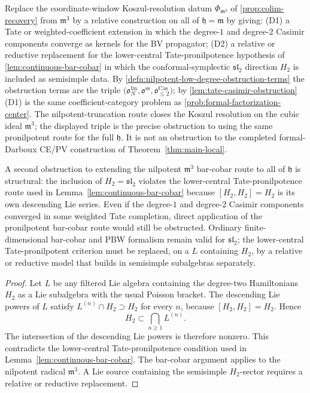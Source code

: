 \begin{prob}
\label{prob:linear-sector-lift}
Replace the coordinate-window Koszul-resolution datum
$\Phi_{\mathfrak m^3}$ of \ref{prop:colim-recovery} from
$\mathfrak m^3$ by a relative construction on all of
$\mathfrak h=\mathfrak m$ by giving:
(D1) a Tate or weighted-coefficient extension in which the degree-$1$
and degree-$2$ Casimir components converge as kernels for the BV
propagator; (D2) a relative or reductive replacement for the
lower-central Tate-pronilpotence hypothesis of
\ref{lem:continuous-bar-cobar} in which the conformal-symplectic
$\mathfrak{sl}_2$ direction $H_2$ is included as semisimple data.  By
\ref{defn:nilpotent-low-degree-obstruction-terms} the obstruction
terms are the triple
\(\bigl(\mathfrak o^{\mathrm{lin}}_N,
   \mathfrak o^{\mathrm{ss}},
   \mathfrak o^{\mathrm{Cas}}_{\leq2}\bigr)\);
by \ref{lem:tate-casimir-obstruction} (D1) is the same
coefficient-category problem as
\ref{prob:formal-factorization-center}.  The nilpotent-truncation route
closes the Koszul resolution on the cubic ideal \(\mathfrak m^3\);
the displayed triple is the precise obstruction to using the same
pronilpotent route for the full \(\mathfrak h\).  It is not an
  obstruction to the completed formal-Darboux CE/PV construction of
Theorem~\ref{thm:main-local}.
\end{prob}

\begin{thm}
\label{thm:conilpotency-essential}
A second obstruction to extending the nilpotent \(\mathfrak m^3\)
bar-cobar route to all of \(\mathfrak h\) is structural: the inclusion of
$H_2=\mathfrak{sl}_2$ violates the lower-central Tate-pronilpotence route
used in Lemma~\ref{lem:continuous-bar-cobar} because
$[H_2,H_2]=H_2$ is its own descending Lie series. Even if the
degree-$1$ and degree-$2$ Casimir components converged in some
weighted Tate completion, direct application of the pronilpotent
bar-cobar route would still be obstructed.  Ordinary finite-dimensional
bar-cobar and PBW formalism remain valid for \(\mathfrak{sl}_2\); the
lower-central Tate-pronilpotent criterion must be replaced, on a
\(L\) containing \(H_2\), by a relative or reductive model that builds in
semisimple subalgebras separately.
\end{thm}

\begin{proof}
  Let \(L\) be any filtered Lie algebra containing the degree-two
  Hamiltonians \(H_2\) as a Lie subalgebra with the usual Poisson
  bracket.  The descending Lie powers of \(L\) satisfy
  \(L^{(n)}\cap H_2\supset H_2\) for every \(n\), because
  \([H_2,H_2]=H_2\).  Hence
  \[
    H_2\subset \bigcap_{n\geq1} L^{(n)} .
  \]
  The intersection of the descending Lie powers is therefore nonzero.
  This contradicts the lower-central Tate-pronilpotence condition used in
  Lemma~\ref{lem:continuous-bar-cobar}.  The bar-cobar argument applies
  to the nilpotent radical \(\mathfrak m^3\).  A Lie source containing
  the semisimple \(H_2\)-sector requires a relative or reductive
  replacement.
\end{proof}

